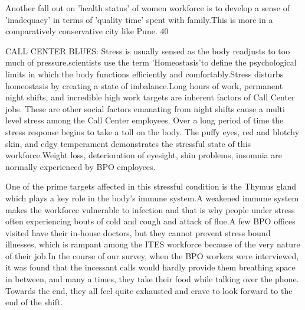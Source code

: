 Another fall out on 'health status' of women workforce is to develop a sense of 'inadequacy' in terms of 'quality time' spent with family.This is more in a comparatively conservative city like Pune. 40%

CALL CENTER BLUES:
Stress is usually sensed as the body readjusts to too much of pressure.scientists use the term 'Homeostasis'to define the psychological limits in which the body functions efficiently and comfortably.Stress disturbs homeostasis by creating a state of imbalance.Long hours of work, permanent night shifts, and incredible high work targets are inherent factors of Call Center jobs. These are other social factors emanating from night shifts cause a multi level stress among the Call Center employees. Over a long period of time the stress response begins to take a toll on the body. The puffy eyes, red and blotchy skin, and edgy temperament demonstrates the stressful state of this workforce.Weight loss, deterioration of eyesight, shin problems, insomnia are normally experienced by BPO employees.

One of the prime targets affected in this stressful condition is the Thymus gland which plays a key role in the body's immune system.A weakened immune system makes the workforce vulnerable to infection and that is why people under stress often experiencing bouts of cold and cough and attack of flue.A few BPO offices visited have their in-house doctors, but they cannot prevent stress bound illnesses, which is rampant among the ITES workforce because of the very nature of their job.In the course of our survey, when the BPO workers were interviewed, it was found that the incessant calls would hardly provide them breathing space in between, and  many a times, they take their food while talking over the phone. Towards the end, they all feel quite exhausted and crave to look forward to the end of the shift.

